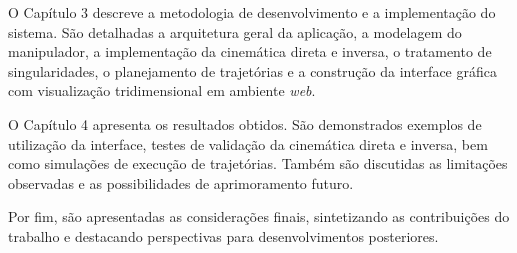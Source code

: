 
O Capítulo 3 descreve a metodologia de desenvolvimento e a implementação do sistema. São detalhadas a arquitetura geral da aplicação, a modelagem do manipulador, a implementação da cinemática direta e inversa, o tratamento de singularidades, o planejamento de trajetórias e a construção da interface gráfica com visualização tridimensional em ambiente \textit{web}.

O Capítulo 4 apresenta os resultados obtidos. São demonstrados exemplos de utilização da interface, testes de validação da cinemática direta e inversa, bem como simulações de execução de trajetórias. Também são discutidas as limitações observadas e as possibilidades de aprimoramento futuro.

Por fim, são apresentadas as considerações finais, sintetizando as contribuições do trabalho e destacando perspectivas para desenvolvimentos posteriores.

